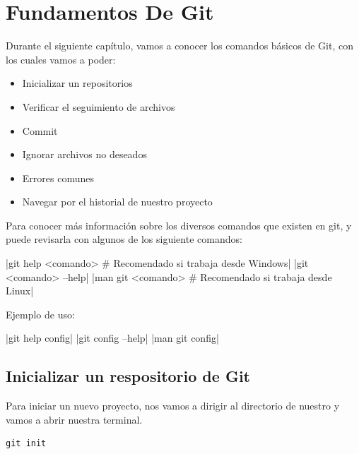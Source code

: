 \newpage

\section{Fundamentos De Git}

Durante el siguiente capítulo, vamos a conocer los comandos básicos de Git, con los cuales vamos a poder:

\begin{itemize}
	\item Inicializar un repositorios
	\item Verificar el seguimiento de archivos
	\item Commit
	\item Ignorar archivos no deseados
	\item Errores comunes
	\item Navegar por el historial de nuestro proyecto
\end{itemize}

\begin{pucpImportant}
Para conocer más información sobre los diversos comandos que existen en git, y puede revisarla con algunos de los siguiente comandos:

	\begin{gitCode}
		|git help <comando> # Recomendado si trabaja desde Windows|
		|git <comando> --help|
		|man git <comando>  # Recomendado si trabaja desde Linux|	
	\end{gitCode}

Ejemplo de uso:

	\begin{terminal}
		|git help config|
		|git config --help|
		|man git config|
	\end{terminal}

\end{pucpImportant}

\subsection{Inicializar un respositorio de Git}

Para iniciar un nuevo proyecto, nos vamos a dirigir al directorio de nuestro y vamos a abrir nuestra terminal.

\begin{gitCode}
\begin{verbatim}
git init 
\end{verbatim}
\end{gitCode}

